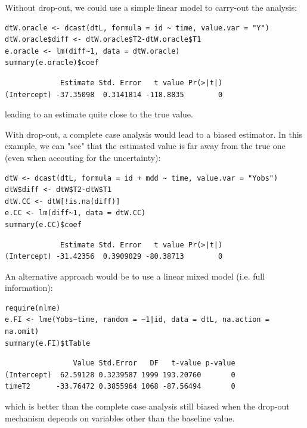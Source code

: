 \documentclass[12pt]{article}
\begin{document}
\bigskip

Without drop-out, we could use a simple linear model to carry-out the analysis:
\lstset{language=r,label= ,caption= ,captionpos=b,numbers=none}
\begin{lstlisting}
dtW.oracle <- dcast(dtL, formula = id ~ time, value.var = "Y")
dtW.oracle$diff <- dtW.oracle$T2-dtW.oracle$T1
e.oracle <- lm(diff~1, data = dtW.oracle)
summary(e.oracle)$coef
\end{lstlisting}

\begin{verbatim}
             Estimate Std. Error   t value Pr(>|t|)
(Intercept) -37.35098  0.3141814 -118.8835        0
\end{verbatim}

leading to an estimate quite close to the true value.

\bigskip

With drop-out, a complete case analysis would lead to a biased
estimator. In this example, we can "see" that the estimated value is
far away from the true one (even when accouting for the uncertainty):
\lstset{language=r,label= ,caption= ,captionpos=b,numbers=none}
\begin{lstlisting}
dtW <- dcast(dtL, formula = id + mdd ~ time, value.var = "Yobs")
dtW$diff <- dtW$T2-dtW$T1
dtW.CC <- dtW[!is.na(diff)]
e.CC <- lm(diff~1, data = dtW.CC)
summary(e.CC)$coef
\end{lstlisting}

\begin{verbatim}
             Estimate Std. Error   t value Pr(>|t|)
(Intercept) -31.42356  0.3909029 -80.38713        0
\end{verbatim}


An alternative approach would be to use a linear mixed model
(i.e. full information):
\lstset{language=r,label= ,caption= ,captionpos=b,numbers=none}
\begin{lstlisting}
require(nlme)
e.FI <- lme(Yobs~time, random = ~1|id, data = dtL, na.action = na.omit)
summary(e.FI)$tTable
\end{lstlisting}

\begin{verbatim}
                Value Std.Error   DF   t-value p-value
(Intercept)  62.59128 0.3239587 1999 193.20760       0
timeT2      -33.76472 0.3855964 1068 -87.56494       0
\end{verbatim}

which is better than the complete case analysis still biased when the
drop-out mechanism depends on variables other than the baseline value.
\end{document}
